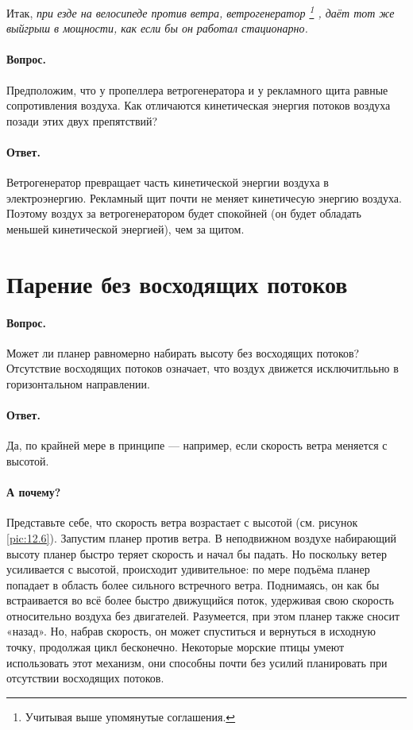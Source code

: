 Итак, \emph{при езде на велосипеде против ветра, ветрогенератор%
\footnote{Учитывая выше упомянутые соглашения.}%
, даёт тот же выйгрыш в мощности, как если бы он работал стационарно.}

\paragraph{Вопрос.} Предположим, что у пропеллера ветрогенератора и у рекламного щита равные сопротивления воздуха.
Как отличаются кинетическая энергия потоков воздуха позади этих двух препятствий?

\paragraph{Ответ.}
Ветрогенератор превращает часть кинетической энергии воздуха в электроэнергию.
Рекламный щит почти не меняет кинетичесую энергию воздуха.
Поэтому воздух за ветрогенератором будет спокойней (он будет обладать меньшей кинетической энергией), чем за щитом.

\section{Парение без восходящих потоков}

\paragraph{Вопрос.}
Может ли планер равномерно набирать высоту без восходящих потоков?
Отсутствие восходящих потоков означает, что воздух движется исключитлььно в горизонтальном направлении.

\paragraph{Ответ.}
Да, по крайней мере в принципе — например, если скорость ветра меняется с высотой.

\paragraph{А почему?}
Представьте себе, что скорость ветра возрастает с высотой (см. рисунок \ref{pic:12.6}).
Запустим планер против ветра.
В неподвижном воздухе набирающий высоту планер быстро теряет скорость и начал бы падать.
Но поскольку ветер усиливается с высотой, происходит удивительное: по мере подъёма планер попадает в область более сильного встречного ветра.
Поднимаясь, он как бы встраивается во всё более быстро движущийся поток, удерживая свою скорость относительно воздуха без двигателей.
Разумеется, при этом планер также сносит «назад».
Но, набрав скорость, он может спуститься и вернуться в исходную точку, продолжая цикл бесконечно.
Некоторые морские птицы умеют использовать этот механизм,
они способны почти без усилий планировать при отсутствии восходящих потоков.

